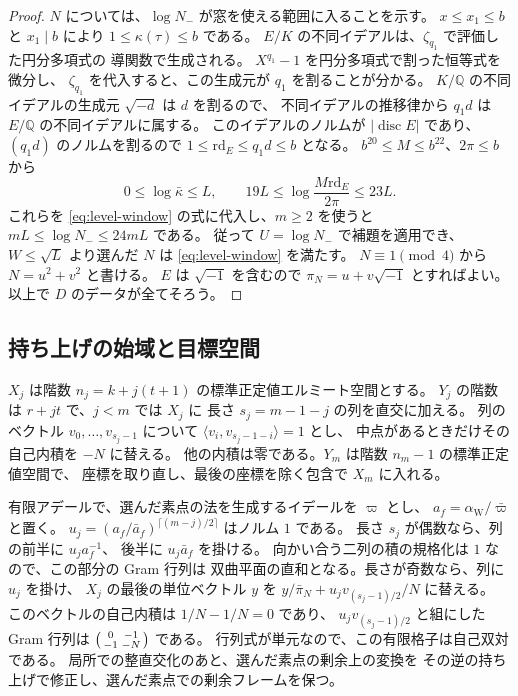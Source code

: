 \begin{proof}
\(N\) については、\(\log N_-\) が窓を使える範囲に入ることを示す。
\(x\le x_1\le b\) と \(x_1\mid b\) により \(1\le\kappa(\tau)\le b\) である。
\(E/K\) の不同イデアルは、\(\zeta_{q_1}\) で評価した円分多項式の
導関数で生成される。
\(X^{q_1}-1\) を円分多項式で割った恒等式を微分し、
\(\zeta_{q_1}\) を代入すると、この生成元が \(q_1\) を割ることが分かる。
\(K/\mathbb Q\) の不同イデアルの生成元 \(\sqrt{-d}\) は \(d\) を割るので、
不同イデアルの推移律から \(q_1d\) は \(E/\mathbb Q\) の不同イデアルに属する。
このイデアルのノルムが \(|\operatorname{disc} E|\) であり、
\((q_1d)\) のノルムを割るので \(1\le\mathrm{rd}_E\le q_1d\le b\) となる。
\(b^{20}\le M\le b^{22}\)、\(2\pi\le b\) から
\[
 0\le\log\bar\kappa\le L,\qquad
 19L\le\log\frac{M\mathrm{rd}_E}{2\pi}\le23L .
\]
これらを \eqref{eq:level-window} の式に代入し、\(m\ge2\) を使うと
\(mL\le\log N_-\le24mL\) である。
従って \(U=\log N_-\) で補題を適用でき、
\(W\le\sqrt L\) より選んだ \(N\) は \eqref{eq:level-window} を満たす。
\(N\equiv1\pmod4\) から \(N=u^2+v^2\) と書ける。
\(E\) は \(\sqrt{-1}\) を含むので \(\pi_N=u+v\sqrt{-1}\) とすればよい。
以上で \(D\) のデータが全てそろう。
\end{proof}

\subsection{持ち上げの始域と目標空間}

\(X_j\) は階数 \(n_j=k+j(t+1)\) の標準正定値エルミート空間とする。
\(Y_j\) の階数は \(r+jt\) で、\(j<m\) では \(X_j\) に
長さ \(s_j=m-1-j\) の列を直交に加える。
列のベクトル \(v_0,\ldots,v_{s_j-1}\) について
\(\langle v_i,v_{s_j-1-i}\rangle=1\) とし、
中点があるときだけその自己内積を \(-N\) に替える。
他の内積は零である。\(Y_m\) は階数 \(n_m-1\) の標準正定値空間で、
座標を取り直し、最後の座標を除く包含で \(X_m\) に入れる。

有限アデールで、選んだ素点の法を生成するイデールを \(\varpi\) とし、
\(a_f=\alpha_\mathrm{W}/\bar\varpi\) と置く。
\(u_j=(a_f/\bar a_f)^{\lceil(m-j)/2\rceil}\) はノルム \(1\) である。
長さ \(s_j\) が偶数なら、列の前半に \(u_j a_f^{-1}\)、
後半に \(u_j\bar a_f\) を掛ける。
向かい合う二列の積の規格化は \(1\) なので、この部分の Gram 行列は
双曲平面の直和となる。長さが奇数なら、列に \(u_j\) を掛け、
\(X_j\) の最後の単位ベクトル \(y\) を
\(y/\bar\pi_N+u_j v_{(s_j-1)/2}/N\) に替える。
このベクトルの自己内積は \(1/N-1/N=0\) であり、
\(u_jv_{(s_j-1)/2}\) と組にした Gram 行列は
\(\begin{psmallmatrix}0&-1\\-1&-N\end{psmallmatrix}\) である。
行列式が単元なので、この有限格子は自己双対である。
局所での整直交化のあと、選んだ素点の剰余上の変換を
その逆の持ち上げで修正し、選んだ素点での剰余フレームを保つ。

